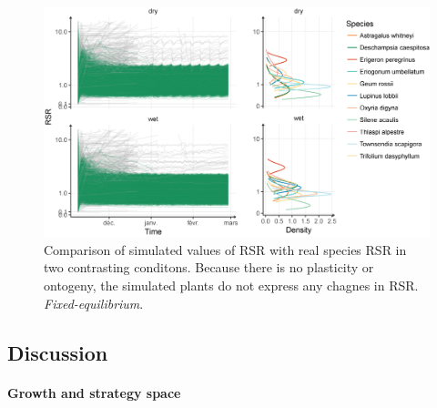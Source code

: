 \begin{figure}
\includegraphics[width = \textwidth]{./2_PP/Figures/Calibration/RSR_full_sim_f-e.png}
\caption{Comparison of simulated values of RSR with real species RSR in two contrasting conditons. Because there is no plasticity or ontogeny, the simulated plants do not express any chagnes in RSR. \textit{Fixed-equilibrium}.}\label{fig:comparison_RSR}
\end{figure}


\vspace{2cm}

\subsection{Discussion}

\paragraph{Growth and strategy space}


